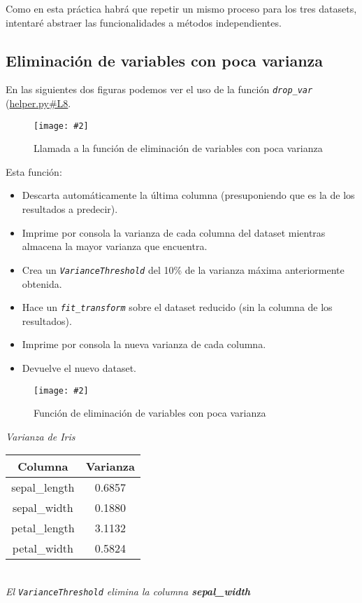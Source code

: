 \documentclass[
12pt, 
spanish, 
singlespacing,
headsepline
]{article}
\newcommand{\smallimage}[2]{
\begin{figure}[H]
	\caption{#1}
	\centering
	\texttt{[image: \#2]}
\end{figure}
}
\begin{document}
Como en esta práctica habrá que repetir un mismo proceso para los tres datasets, intentaré abstraer las funcionalidades a métodos independientes.

\subsection{Eliminación de variables con poca varianza}
En las siguientes dos figuras podemos ver el uso de la función \texttt{\textit{drop_var}} (\href{https://github.com/uo272509/InteligenciaNegocioPL/blob/7f59f8fb2b83986595ab9083fa9a6d28ed39c67c/Prac2/helper.py\#L8}{helper.py\#L8}. 
\smallimage{Llamada a la función de eliminación de variables con poca varianza}{pl2/Figure_7.png}

Esta función:
\begin{itemize}
\item Descarta automáticamente la última columna (presuponiendo que es la de los resultados a predecir).
\item Imprime por consola la varianza de cada columna del dataset mientras almacena la mayor varianza que encuentra.
\item Crea un \texttt{\textit{VarianceThreshold}} del 10\% de la varianza máxima anteriormente obtenida.
\item Hace un \texttt{\textit{fit_transform}} sobre el dataset reducido (sin la columna de los resultados).
\item Imprime por consola la nueva varianza de cada columna.
\item Devuelve el nuevo dataset.
\end{itemize}

\smallimage{Función de eliminación de variables con poca varianza}{pl2/Figure_7.1.png}

\begin{center}
\emph{Varianza de Iris}\\
\begin{tabular}{|c|c|}
\hline 
Columna & Varianza\\ 
\hline 
sepal_length & 0.6857\\ 
\hline
sepal_width & 0.1880\\ 
\hline
petal_length & 3.1132\\ 
\hline
petal_width & 0.5824\\ 
\hline 
\end{tabular}\\

\textit{El \texttt{VarianceThreshold} elimina la columna \textbf{sepal_width}}
\end{center}
\end{document}
